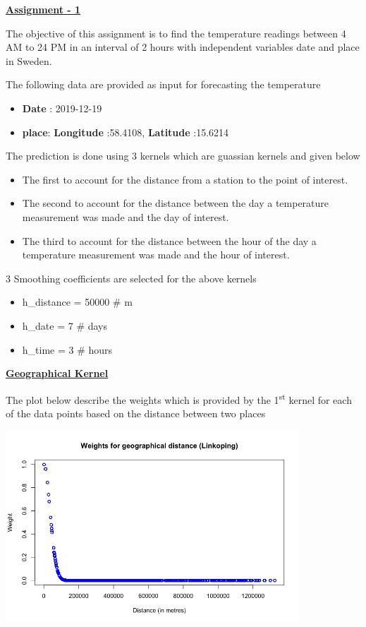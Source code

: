 \documentclass[a4paper,10pt]{article}
\begin{document}
\textbf{\underline{Assignment - 1}} \par
The objective of this assignment is to find the temperature readings between 4 AM to 24 PM in an interval of 2 hours with independent variables
date and  place in Sweden. \par
The following data are provided as input for forecasting the temperature
\begin{itemize}
  \item \textbf{Date} : 2019-12-19
  \item \textbf{place}: \textbf{Longitude} :58.4108, \textbf{Latitude} :15.6214
\end{itemize}
The prediction is done using 3 kernels which are guassian kernels and given below
\begin{itemize}
  \item The first to account for the distance from a station to the point of interest.
  \item The second to account for the distance between the day a temperature measurement was made and the day of interest.
  \item The third to account for the distance between the hour of the day a temperature measurement was made and the hour of interest.
\end{itemize}
3 Smoothing coefficients are selected for the above kernels 
\begin{itemize}
  \item h\_distance = 50000  \# m
  \item h\_date = 7 \# days
  \item h\_time = 3 \# hours
\end{itemize}
\textbf{\underline{Geographical Kernel}} \par
The plot below describe the weights which is provided by the 1\textsuperscript{st} kernel for each of the data points based on the distance between two places \par
\begin{center}
  \includegraphics[width=110mm,scale=0.10]{Weights_Distance_1.png}
\end{center}
\end{document}
